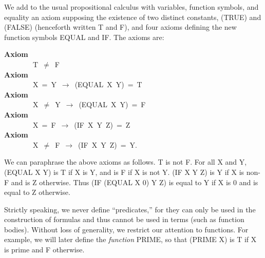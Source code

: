 \documentclass[10pt]{book}
\newenvironment{pubasis}{\begin{flushleft}}{\end{flushleft}}
\newcommand{\axiomordefinition}[1]{\vspace{6pt}\Large\textsf{\textbf{#1}}\normalsize}
\begin{document}
We add to the usual propositional calculus with variables, function
symbols, and equality an axiom
supposing the existence of two distinct constants, (TRUE) and (FALSE)
(henceforth  written T and F),
and four axioms defining the new function symbols EQUAL and IF.
The axioms are:
\begin{pubasis}
\axiomordefinition{Axiom}\\
~~~~~~~~T~$\neq$~F\\

\axiomordefinition{Axiom}\\
~~~~~~~~X~=~Y~$\rightarrow$~(EQUAL~X~Y)~=~T\\

\axiomordefinition{Axiom}\\
~~~~~~~~X~$\neq$~Y~$\rightarrow$~(EQUAL~X~Y)~=~F\\

\axiomordefinition{Axiom}\\
~~~~~~~~X~=~F~$\rightarrow$~(IF~X~Y~Z)~=~Z\\

\axiomordefinition{Axiom}\\
~~~~~~~~X~$\neq$~F~$\rightarrow$~(IF~X~Y~Z)~=~Y.\\
\end{pubasis}
We can paraphrase the above axioms as follows.  T is not F.  For all X and Y,
(EQUAL X Y) is T if X is Y,
and is F if X is not Y.
(IF X Y Z) is Y if X is non-F and is Z otherwise.
Thus
(IF (EQUAL X 0) Y Z)
is equal to Y if X is 0 and is equal to Z otherwise.

Strictly speaking, we never define ``predicates,'' for they can only be used
in the construction of
formulas and thus cannot be used in terms (such as function
bodies).  Without loss of generality, we restrict our attention to
functions.
For example, we will later define
the \emph{function} PRIME, so that (PRIME X) is T if X is prime and F
otherwise.
\end{document}

